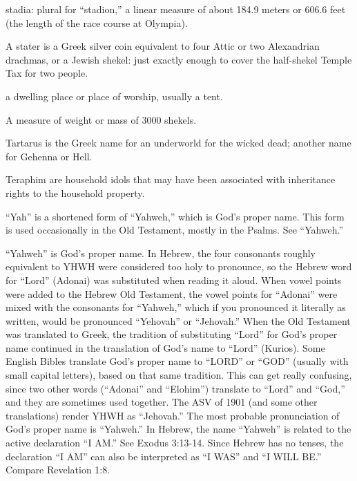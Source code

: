 \begin{multicols}{2}
stadia: plural for {``}stadion,{''} a linear measure of about 184.9
meters or 606.6 feet (the length of the race course at Olympia).

A stater is a Greek silver coin equivalent to four Attic or two
Alexandrian drachmas, or a Jewish shekel: just exactly enough to
cover the half-shekel Temple Tax for two people.

a dwelling place or place of worship, usually a tent.

A measure of weight or mass of 3000 shekels.

Tartarus is the Greek name for an underworld for the wicked dead;
another name for Gehenna or Hell.

Teraphim are household idols that may have been associated with
inheritance rights to the household property.

{``}Yah{''} is a shortened form of {``}Yahweh,{''} which is God's
proper name. This form is used occasionally in the Old Testament,
mostly in the Psalms. See {``}Yahweh.{''}

{``}Yahweh{''} is God's proper name. In Hebrew, the four consonants
roughly equivalent to YHWH were considered too holy to pronounce, so
the Hebrew word for {``}Lord{''} (Adonai) was substituted when
reading it aloud. When vowel points were added to the Hebrew Old
Testament, the vowel points for {``}Adonai{''} were mixed with the
consonants for {``}Yahweh,{''} which if you pronounced it literally
as written, would be pronounced {``}Yehovah{''} or {``}Jehovah.{''}
When the Old Testament was translated to Greek, the tradition of
substituting {``}Lord{''} for God's proper name continued in the
translation of God's name to {``}Lord{''} (Kurios). Some English
Bibles translate God's proper name to {``}LORD{''} or {``}GOD{''}
(usually with small capital letters), based on that same tradition.
This can get really confusing, since two other words ({``}Adonai{''}
and {``}Elohim{''}) translate to {``}Lord{''} and {``}God,{''} and
they are sometimes used together. The ASV of 1901 (and some other
translations) render YHWH as {``}Jehovah.{''} The most probable
pronunciation of God's proper name is {``}Yahweh.{''} In Hebrew, the
name {``}Yahweh{''} is related to the active declaration {``}I
AM.{''} See Exodus 3:13-14. Since Hebrew has no tenses, the
declaration {``}I AM{''} can also be interpreted as {``}I WAS{''} and
{``}I WILL BE.{''} Compare Revelation 1:8.

\end{multicols}
